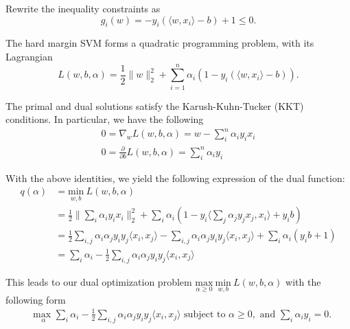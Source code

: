 \documentclass[10pt]{article}
\begin{document}
Rewrite the inequality constraints as 
\begin{equation}
	g_i(w) = -y_i(\langle w,x_i\rangle - b) + 1 \leq 0.
\end{equation}

The hard margin SVM forms a quadratic programming problem, with its Lagrangian
\begin{equation}
	L(w,b,\alpha) = \frac{1}{2} \lVert w \rVert_{2}^2 + \sum_{i=1}^{n}\alpha_i(1 - y_i(\langle w,x_i \rangle - b)). 
\end{equation} 

The primal and dual solutions satisfy the Karush-Kuhn-Tucker (KKT) conditions. In particular, we have the following
\begin{subequations}
\begin{align}
0 = \nabla_{w} L(w,b,\alpha) = w - \sum_{i}^{n}\alpha_i y_i x_i \\
0 = \frac{\partial}{\partial b} L(w,b,\alpha) = \sum_{i}^{n}\alpha_i y_i
\end{align}
\end{subequations}

With the above identities, we yield the following expression of the dual function:
\begin{equation}
\begin{aligned}
q(\alpha) 
& = \underset{w,b}{\text{min}}\: L(w,b,\alpha)\\
& = \frac{1}{2} \Bigg \lVert \sum_{i}^{}\alpha_i y_i x_i \Bigg \rVert_{2}^2  + \sum_{i}^{}\alpha_i (1-y_i \Bigg \langle \sum_{j}^{}\alpha_j y_j x_j,x_i \Bigg \rangle + y_i b )\\
& = \frac{1}{2} \sum_{i,j}^{}\alpha_i \alpha_j y_i y_j \langle x_i, x_j\rangle - \sum_{i,j}^{}\alpha_i \alpha_j y_i y_j \langle x_i, x_j\rangle + \sum_{i}^{}\alpha_i(y_i b + 1)\\
& = \sum_{i}^{}\alpha_i - \frac{1}{2} \sum_{i,j}^{}\alpha_i \alpha_j y_i y_j \langle x_i, x_j\rangle
\end{aligned}
\end{equation}
 

This leads to our dual optimization problem $\underset{\alpha \geq 0}{\text{max}} \: \underset{w,b}{\text{min}}\: L(w,b,\alpha)$ with the following form
\begin{equation} \label{eq:6}
\begin{aligned}
& \underset{\alpha}{\text{max }} 
\sum_{i}^{}\alpha_i - \frac{1}{2} \sum_{i,j}^{}\alpha_i \alpha_j y_i y_j \langle x_i, x_j\rangle
\text{ subject to }
\alpha \geq 0, \text{ and }
\sum_{i}^{} \alpha_i y_i = 0.
\end{aligned}
\end{equation}
\end{document}
